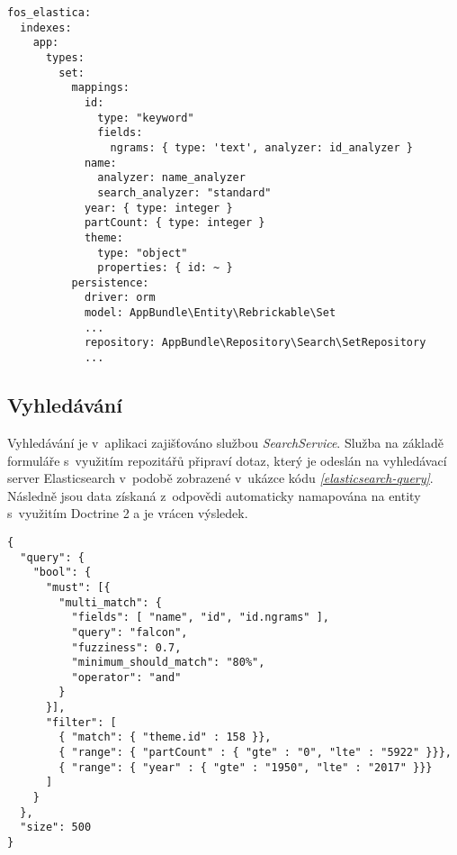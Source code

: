 \begin{listing}[htbp]
  \begin{verbatim}
fos_elastica:
  indexes:
    app:
      types:
        set:
          mappings:
            id:
              type: "keyword"
              fields:
                ngrams: { type: 'text', analyzer: id_analyzer }
            name: 
              analyzer: name_analyzer 
              search_analyzer: "standard"
            year: { type: integer }
            partCount: { type: integer }
            theme:
              type: "object"
              properties: { id: ~ }
          persistence:
            driver: orm
            model: AppBundle\Entity\Rebrickable\Set
            ...
            repository: AppBundle\Repository\Search\SetRepository
            ...
  \end{verbatim}
  \caption{Ukázka nastavení mapování entity \label{elasticsearch-set-index}}
\end{listing}

\subsection{Vyhledávání}
Vyhledávání je v~aplikaci zajišťováno službou \textit{SearchService}. Služba na základě formuláře s~využitím repozitářů připraví dotaz, který je odeslán na vyhledávací server Elasticsearch v~podobě zobrazené v~ukázce kódu \emph{\ref{elasticsearch-query}}. Následně jsou data získaná z~odpovědi automaticky namapována na entity s~využitím Doctrine 2 a je vrácen výsledek.

\begin{listing}[htbp]
  \begin{verbatim}
{
  "query": {
    "bool": { 
      "must": [{
        "multi_match": {
          "fields": [ "name", "id", "id.ngrams" ],
          "query": "falcon", 
          "fuzziness": 0.7,
          "minimum_should_match": "80%",
          "operator": "and"
        }
      }],
      "filter": [
        { "match": { "theme.id" : 158 }},
        { "range": { "partCount" : { "gte" : "0", "lte" : "5922" }}},
        { "range": { "year" : { "gte" : "1950", "lte" : "2017" }}}
      ]
    }
  },
  "size": 500
}
        \end{verbatim}
  \caption{Ukázka JSON dotazu Elasticsearch\label{elasticsearch-query}}
\end{listing}

